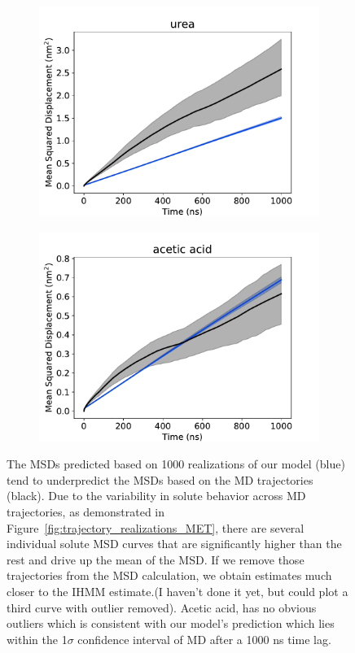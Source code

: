 \documentclass[journal=jpcbfk,manuscript=article]{achemso}
\begin{document}
\begin{figure}
\begin{subfigure}{0.45\textwidth}
  \includegraphics[width=\textwidth]{msd_URE.pdf}
  \caption{}\label{fig:msd_URE}
  \end{subfigure}
  \begin{subfigure}{0.45\textwidth}
  \includegraphics[width=\textwidth]{msd_ACH.pdf}
  \caption{}\label{fig:msd_ACH}
  \end{subfigure}
  \caption{The MSDs predicted based on 1000 realizations of our model (blue) tend to underpredict
  the MSDs based on the MD trajectories (black). Due to the variability in solute behavior across MD trajectories,
  as demonstrated in Figure~\ref{fig:trajectory_realizations_MET}, there are several 
  individual solute MSD curves that are significantly higher than the rest and drive up the
  mean of the MSD. If we remove those trajectories from the MSD calculation, we obtain 
  estimates much closer to the IHMM estimate.(I haven't done it yet, but could plot a third curve
  with outlier removed). Acetic acid, has no obvious outliers which is consistent with our model's
  prediction which lies within the 1$\sigma$ confidence interval of MD after a 1000 ns time lag.}\label{fig:msds}
  \end{figure}
  
\end{document}
